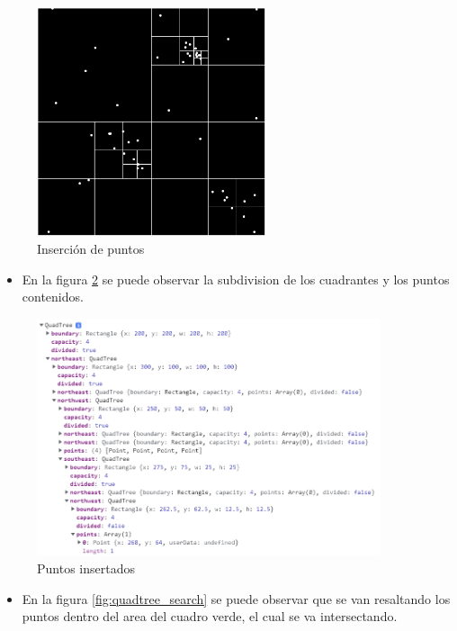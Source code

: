 \documentclass{article}
\begin{document}
\begin{figure}[h!]
	\centering
	\includegraphics[width=0.6\textwidth]{img/quadtree_insert.png}
	\caption{Inserción de puntos}
	\label{fig:quadtree_insert}
\end{figure}

\begin{itemize}
	\item En la figura \ref{fig:quadtree_insert_data} se puede observar la subdivision de los cuadrantes y los puntos contenidos.
\end{itemize}

\begin{figure}[h!]
	\centering
	\includegraphics[width=0.9\textwidth]{img/quadtree_insert_data.png}
	\caption{Puntos insertados}
	\label{fig:quadtree_insert_data}
\end{figure}

\begin{itemize}
	\item En la figura \ref{fig:quadtree_search} se puede observar que se van resaltando los puntos dentro del area del cuadro verde, el cual se va intersectando.
\end{itemize}
\end{document}
